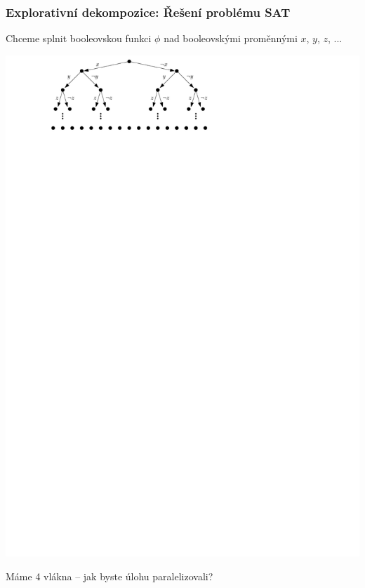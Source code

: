 \documentclass[usenames,dvipsnames,9pt]{beamer}
\begin{document}
\begin{frame}[t]
	\frametitle{Explorativní dekompozice: Řešení problému SAT}

	Chceme splnit booleovskou funkci $\phi$ nad booleovskými proměnnými $x$, $y$, $z$, ...
	\begin{05/figure}
		\centering\includegraphics[width=0.8\linewidth]{05/figs/sat1.pdf}
	\end{05/figure}

	\vspace{1em}
	\begin{center}
		\Large Máme 4 vlákna -- jak byste úlohu paralelizovali?
	\end{center}
\end{frame}
\end{document}
